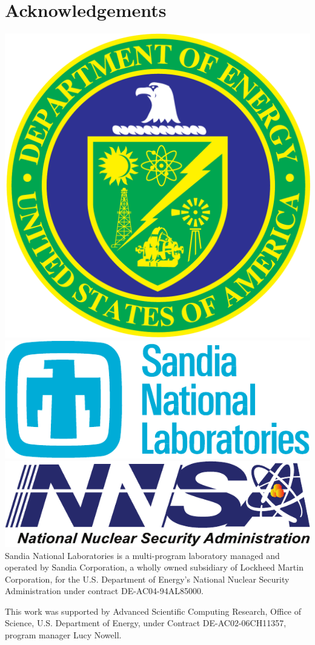 \documentclass[conference]{IEEEtran}
\begin{document}
\section*{Acknowledgements}

\includegraphics[scale=0.07]{logos/doe_logo}
\includegraphics[scale=0.30]{logos/snl_logo}
\includegraphics[scale=0.35]{logos/nnsa_logo}
Sandia National Laboratories is a multi-program laboratory managed and operated
by Sandia Corporation, a wholly owned subsidiary of Lockheed Martin
Corporation, for the U.S. Department of Energy's National Nuclear Security
Administration under contract DE-AC04-94AL85000.

This work was supported by Advanced Scientific Computing Research, Office of
Science, U.S. Department of Energy, under Contract DE-AC02-06CH11357, program
manager Lucy Nowell.




\vfill\eject
\end{document}
